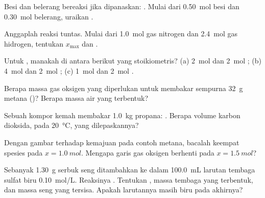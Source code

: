 \begin{exercise}[$\star$]\label{exo:g10:reaction-progress-table:3}
Besi dan belerang bereaksi jika dipanaskan: . Mulai
dari \qty{0.50}{mol} besi dan \qty{0.30}{mol} belerang, uraikan .
\end{exercise}

\begin{exercise}[$\star$]\label{exo:g10:reaction-progress-table:4}
Anggaplah reaksi  tuntas. Mulai dari
\qty{1.0}{mol} gas nitrogen dan \qty{2.4}{mol} gas hidrogen, tentukan
$x_{\max}$ dan .
\end{exercise}

\begin{exercise}[$\star$]\label{exo:g10:reaction-progress-table:5}
Untuk , manakah di antara  berikut yang
stoikiometris? (a) \qty{2}{mol}  dan \qty{2}{mol} ;
(b) \qty{4}{mol}  dan \qty{2}{mol} ; (c) \qty{1}{mol}
 dan \qty{2}{mol} .
\end{exercise}

\begin{exercise}[$\star\star$]\label{exo:g10:reaction-progress-table:6}
Berapa massa gas oksigen yang diperlukan untuk membakar sempurna
\qty{32}{g} metana ()? Berapa massa air yang
terbentuk?
\end{exercise}

\begin{exercise}[$\star\star$]\label{exo:g10:reaction-progress-table:7}
Sebuah kompor kemah membakar \qty{1.0}{kg} propana:
. Berapa volume karbon dioksida, pada
\qty{20}{\celsius}, yang dilepaskannya?
\end{exercise}

\begin{exercise}[$\star\star$]\label{exo:g10:reaction-progress-table:8}
Dengan gambar  terhadap kemajuan pada contoh metana, bacalah
 keempat spesies pada $x = \qty{1.0}{mol}$. Mengapa garis gas
oksigen berhenti pada $x = \qty{1.5}{mol}$?
\end{exercise}

\begin{exercise}[$\star\star$]\label{exo:g10:reaction-progress-table:9}
Sebanyak \qty{1.30}{g} serbuk seng ditambahkan ke dalam \qty{100.0}{mL}
larutan tembaga sulfat biru \qty{0.10}{mol/L}. Reaksinya
.
Tentukan , massa tembaga yang terbentuk, dan massa seng
yang tersisa. Apakah larutannya masih biru pada akhirnya?
\end{exercise}

